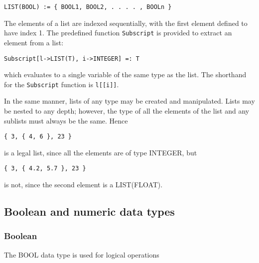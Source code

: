 \begin{verbatim}
LIST(BOOL) := { BOOL1, BOOL2, . . . . , BOOLn }
\end{verbatim}

The elements of a list are indexed sequentially, with the first element
defined to have index 1.  The predefined function \verb+Subscript+ is
provided to extract an element from a list:

\begin{verbatim}
Subscript[l->LIST(T), i->INTEGER] =: T
\end{verbatim}

\noindent which evaluates to a single variable of the same type as the list.
The shorthand for the \verb+Subscript+ function is \verb+l[[i]]+.

In the same manner, lists of any type may be created and manipulated.
Lists may be nested to any depth; however, the type of all the elements
of the list and any sublists must always be the same.  Hence

\begin{verbatim}
{ 3, { 4, 6 }, 23 }
\end{verbatim}

is a legal list, since all the elements are of type INTEGER, but

\begin{verbatim}
{ 3, { 4.2, 5.7 }, 23 }
\end{verbatim}

is not, since the second element is a LIST(FLOAT).

\subsection{Boolean and numeric data types}

\subsubsection{Boolean}

The BOOL data type is used for logical operations

